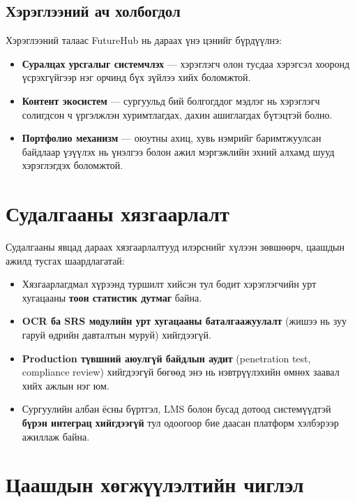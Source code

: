 \subsection{Хэрэглээний ач холбогдол}

Хэрэглээний талаас FutureHub нь дараах үнэ цэнийг бүрдүүлнэ:

\begin{itemize}[leftmargin=2em]
    \item \textbf{Суралцах урсгалыг системчлэх} --- хэрэглэгч олон тусдаа хэрэгсэл хооронд үсрэхгүйгээр нэг орчинд бүх зүйлээ хийх боломжтой.
    \item \textbf{Контент экосистем} --- сургуульд бий болгогддог мэдлэг нь хэрэглэгч солигдсон ч үргэлжлэн хуримтлагдах, дахин ашиглагдах бүтэцтэй болно.
    \item \textbf{Портфолио механизм} --- оюутны ахиц, хувь нэмрийг баримтжуулсан байдлаар үзүүлэх нь үнэлгээ болон ажил мэргэжлийн эхний алхамд шууд хэрэглэгдэх боломжтой.
\end{itemize}


\section{Судалгааны хязгаарлалт}

Судалгааны явцад дараах хязгаарлалтууд илэрснийг хүлээн зөвшөөрч, цаашдын ажилд тусгах шаардлагатай:

\begin{itemize}[leftmargin=2em]
    \item Хязгаарлагдмал хүрээнд туршилт хийсэн тул бодит хэрэглэгчийн урт хугацааны \textbf{тоон статистик дутмаг} байна.
    \item \textbf{OCR ба SRS модулийн урт хугацааны баталгаажуулалт} (жишээ нь зуу гаруй өдрийн давталтын муруй) хийгдээгүй.
    \item \textbf{Production түвшний аюулгүй байдлын аудит} (penetration test, compliance review) хийгдээгүй бөгөөд энэ нь нэвтрүүлэхийн өмнөх заавал хийх ажлын нэг юм.
    \item Сургуулийн албан ёсны бүртгэл, LMS болон бусад дотоод системүүдтэй \textbf{бүрэн интеграц хийгдээгүй} тул одоогоор бие даасан платформ хэлбэрээр ажиллаж байна.
\end{itemize}


\section{Цаашдын хөгжүүлэлтийн чиглэл}


